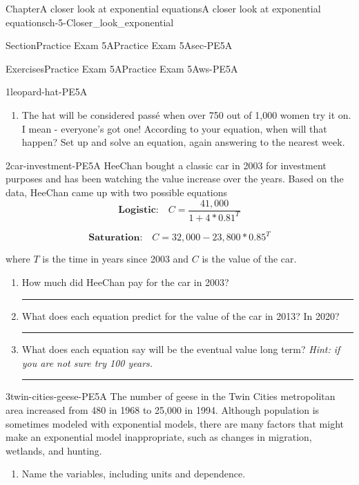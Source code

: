 \documentclass[twoside,11pt,]{book}
\newlength{\workspacestrutwidth}
\numberwithin{equation}{section}
\begin{document}
\begin{chapterptx}{Chapter}{A closer look at exponential equations}{}{A closer look at exponential equations}{}{}{ch-5-Closer_look_exponential}
\begin{sectionptx}{Section}{Practice Exam 5A}{}{Practice Exam 5A}{}{}{sec-PE5A}
\begin{exercises-subsection-numberless}{Exercises}{Practice Exam 5A}{}{Practice Exam 5A}{}{}{ws-PE5A}
\begin{divisionexercise}{1}{}{}{leopard-hat-PE5A}
\begin{enumerate}[label=(\alph*),ref=\alph*]
\item{}The hat will be considered passé when over 750 out of 1,000 women try it on. I mean - everyone's got one! According to your equation, when will that happen? Set up and solve an equation, again answering to the nearest week.%
\end{enumerate}%
\end{divisionexercise}%
\clearpage
\begin{divisionexercise}{2}{}{}{car-investment-PE5A}%
HeeChan bought a classic car in 2003 for investment purposes and has been watching the value increase over the years. Based on the data, HeeChan came up with two possible equations%
\begin{equation*}
\textbf{Logistic:} \quad C= \frac{41,000}{1+4\ast0.81^T}
\end{equation*}
%
 \par
%
\begin{equation*}
\textbf{Saturation:} \quad C = 32,000-23,800\ast0.85^T
\end{equation*}
%
 \par
where \(T\) is the time in years since 2003 and \textdollar{}\(C\) is the value of the car.%
\begin{enumerate}[label=(\alph*),ref=\alph*]%
\item{}How much did HeeChan pay for the car in 2003?%
\par\rule{\workspacestrutwidth}{1.75in}%
\item{}What does each equation predict for the value of the car in 2013? In 2020?%
\par\rule{\workspacestrutwidth}{1.75in}%
\item{}What does each equation say will be the eventual value long term? \emph{Hint: if you are not sure try 100 years.}%
\par\rule{\workspacestrutwidth}{1.75in}%
\end{enumerate}%
\end{divisionexercise}%
\clearpage
\begin{divisionexercise}{3}{}{}{twin-cities-geese-PE5A}%
The number of geese in the Twin Cities metropolitan area increased from 480 in 1968 to 25,000 in 1994. Although population is sometimes modeled with exponential models, there are many factors that might make an exponential model inappropriate, such as changes in migration, wetlands, and hunting.%
\begin{enumerate}[label=(\alph*),ref=\alph*]%
\item{}Name the variables, including units and dependence.%

\end{enumerate}
\end{divisionexercise}
\end{exercises-subsection-numberless}
\end{sectionptx}
\end{chapterptx}
\end{document}
